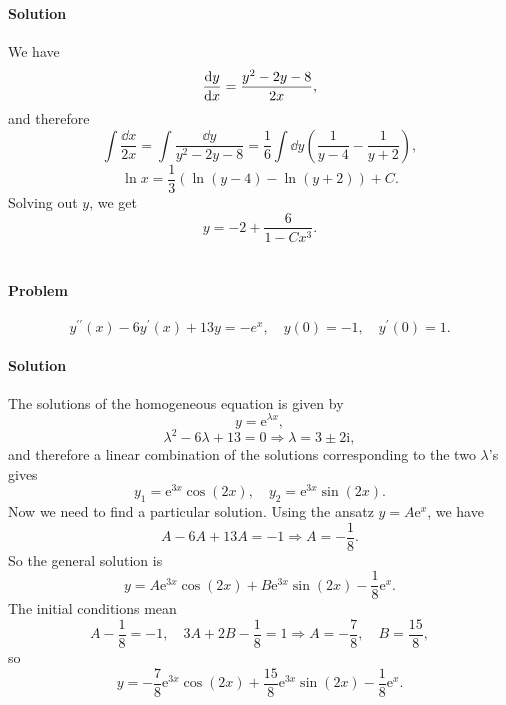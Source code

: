 \documentclass[hyperref, a4paper]{article}
\newcommand*{\ii}{\mathrm{i}}
\newcommand*{\ee}{\mathrm{e}}
\begin{document}
\paragraph*{Solution} We have 
\[
    \dv{y}{x} = \frac{y^2 - 2y - 8}{2 x}, 
\]
and therefore
\[
    \int \frac{\dd{x}}{2x} = \int \frac{\dd{y}}{y^2 - 2y - 8} 
    = \frac{1}{6} \int \dd{y} \left(
        \frac{1}{y-4} - \frac{1}{y+2}
    \right) , 
\]
\[
    \ln x = \frac{1}{3} (\ln (y - 4) - \ln (y + 2)) + C.
\]
Solving out $y$, we get 
\begin{equation}
    y = -2 + \frac{6}{1 - C x^3}.
\end{equation}

\section{}

\paragraph*{Problem} \begin{equation}
    y^{\prime \prime}(x)-6 y^{\prime}(x)+13 y=-e^x , \quad y(0)=-1, \quad y^{\prime}(0)=1.
\end{equation}


\paragraph*{Solution} The solutions of the homogeneous equation is given by
\[
    y = \ee^{\lambda x}, 
\]
\[
    \lambda^2 - 6 \lambda + 13 = 0 \Rightarrow
    \lambda = 3 \pm 2 \ii,
\]
and therefore a linear combination of the solutions corresponding to the two $\lambda$'s gives 
\begin{equation}
    y_1 = \ee^{3x} \cos(2x), \quad 
    y_2 = \ee^{3x} \sin(2x).
\end{equation}
Now we need to find a particular solution. 
Using the ansatz $y = A \ee^{x}$, 
we have 
\[
    A - 6 A + 13 A= - 1 \Rightarrow A = -\frac{1}{8}.
\]
So the general solution is 
\begin{equation}
    y = A \ee^{3x} \cos(2x) + B \ee^{3x} \sin(2x) - \frac{1}{8} \ee^{x}.
\end{equation}
The initial conditions mean
\[
    A - \frac{1}{8} = -1, \quad 
    3 A + 2 B - \frac{1}{8} = 1
    \Rightarrow A = - \frac{7}{8}, \quad B = \frac{15}{8},
\]
so 
\begin{equation}
    y = - \frac{7}{8} \ee^{3x} \cos(2x) + \frac{15}{8} \ee^{3x} \sin(2x) - \frac{1}{8} \ee^{x}.
\end{equation}
\end{document}
